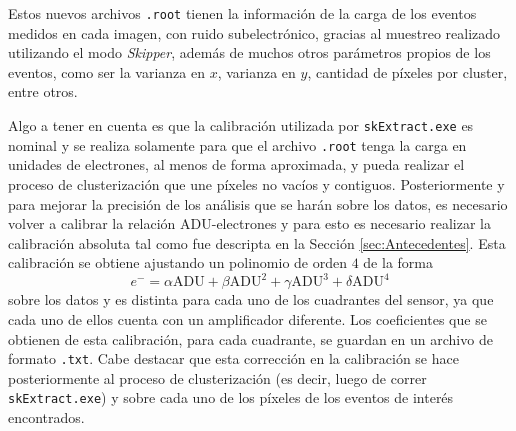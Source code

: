 Estos nuevos archivos \verb|.root| tienen la información de la carga de los eventos medidos en cada imagen, con ruido subelectrónico, gracias al muestreo realizado utilizando el modo \textit{Skipper}, además de muchos otros parámetros propios de los eventos, como ser la varianza en $x$, varianza en $y$, cantidad de píxeles por cluster, entre otros.

Algo a tener en cuenta es que la calibración utilizada por \verb|skExtract.exe| es nominal y se realiza solamente para que el archivo \verb|.root| tenga la carga en unidades de electrones, al menos de forma aproximada, y pueda realizar el proceso de clusterización que une píxeles no vacíos y contiguos. Posteriormente y para mejorar la precisión de los análisis que se harán sobre los datos, es necesario volver a calibrar la relación ADU-electrones y para esto es necesario realizar la calibración absoluta tal como fue descripta en la Sección \ref{sec:Antecedentes}. Esta calibración se obtiene ajustando un polinomio de orden $4$ de la forma
\begin{equation*}
    e^{-} 
    = \alpha \mbox{ADU} 
    + \beta \mbox{ADU}^{2}
    + \gamma \mbox{ADU}^{3}
    + \delta \mbox{ADU}^{4}
\end{equation*}
sobre los datos y es distinta para cada uno de los cuadrantes del sensor, ya que cada uno de ellos cuenta con un amplificador diferente. Los coeficientes que se obtienen de esta calibración, para cada cuadrante, se guardan en un archivo de formato \verb|.txt|. Cabe destacar que esta corrección en la calibración se hace posteriormente al proceso de clusterización (es decir, luego de correr \verb|skExtract.exe|) y sobre cada uno de los píxeles de los eventos de interés encontrados.

